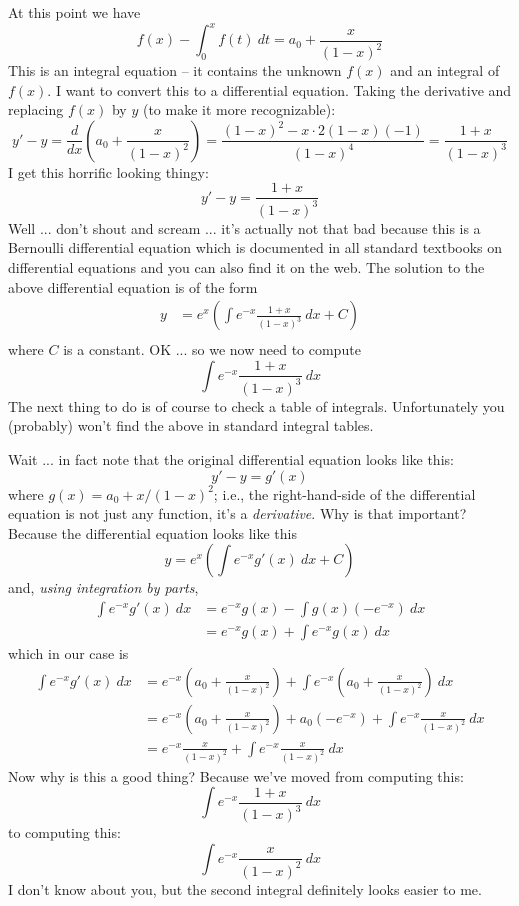At this point we have
\[
f(x) - \int_0^x f(t) \ dt = a_0 + \frac{x}{(1-x)^2}
\]
This is an integral equation -- it contains the unknown $f(x)$
and an integral of $f(x)$.
I want to convert this to a differential equation.
Taking the derivative and replacing $f(x)$ by $y$ (to make it more
recognizable):
\[
y' - y
= \frac{d}{dx} \left( a_0 + \frac{x}{(1-x)^2} \right)
= \frac{(1-x)^2 - x \cdot 2(1-x)(-1)}{(1-x)^4} = \frac{1+x}{(1-x)^3}
\]
I get this horrific looking thingy:
\[
y' - y = \frac{1+x}{(1-x)^3}
\]
Well ... don't shout and scream ... it's actually not that bad because
this is a Bernoulli differential equation which is documented
in all standard textbooks on differential equations and you can
also find it on the web.
The solution to the above differential equation is of the form
\begin{align*}
y
&= e^x
  \left(
  \int e^{-x} \frac{1+x}{(1-x)^3} \ dx + C
  \right)
   \\
\end{align*}
where $C$ is a constant.
OK ... so we now need to compute
\[
  \int e^{-x} \frac{1+x}{(1-x)^3} \ dx
\]
The next thing to do is of course to check a table of integrals.
Unfortunately you (probably) won't find the above
in standard integral tables.

Wait ... in fact note that the original differential equation looks like this:
\[
y' - y = g'(x)
\]
where $g(x) = a_0 + x/(1-x)^2$; i.e., the right-hand-side of the differential
equation is not just any function, it's a \textit{derivative}.
Why is that important?
Because the differential equation looks like this
\[
y = e^x \left(
  \int e^{-x} g'(x) \ dx + C
  \right)
\]
and, \textit{using integration by parts},
\begin{align*}
  \int e^{-x} g'(x) \ dx
&= e^{-x} g(x) - \int g(x)(-e^{-x}) \ dx \\
&= e^{-x} g(x) + \int e^{-x} g(x) \ dx
\end{align*}
which in our case is
\begin{align*}
\int e^{-x} g'(x) \ dx
&= e^{-x} \left( a_0 + \frac{x}{(1-x)^2} \right)
+ \int e^{-x} \left( a_0 + \frac{x}{(1-x)^2} \right) \ dx
\\
&= e^{-x} \left( a_0 + \frac{x}{(1-x)^2} \right)
+ a_0(-e^{-x}) + \int e^{-x} \frac{x}{(1-x)^2}\ dx
\\
&= e^{-x} \frac{x}{(1-x)^2} 
+ \int e^{-x} \frac{x}{(1-x)^2}\ dx
\end{align*}
Now why is this a good thing?
Because we've moved from computing this:
\[
  \int e^{-x} \frac{1+x}{(1-x)^3} \ dx
\]
to computing this:
\[
\int e^{-x} \frac{x}{(1-x)^2}\ dx
\]
I don't know about you, but the second integral
definitely looks easier to me.


